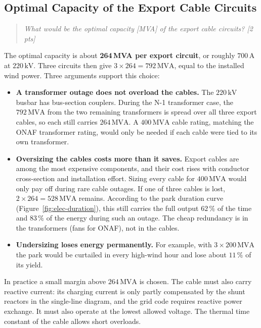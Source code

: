 \subsection{Optimal Capacity of the Export Cable Circuits}
\label{sec:elec-export-capacity}
\begin{quote}
\emph{What would be the optimal capacity [MVA] of the export cable circuits? [2 pts]}
\end{quote}

The optimal capacity is about \textbf{264\,MVA per export circuit}, or roughly $700\,\mathrm{A}$ at $220\,\mathrm{kV}$. Three circuits then give $3 \times 264 = 792\,\mathrm{MVA}$, equal to the installed wind power. Three arguments support this choice:

\begin{itemize}
    \item \textbf{A transformer outage does not overload the cables.} The $220\,\mathrm{kV}$ busbar has bus-section couplers. During the N-1 transformer case, the $792\,\mathrm{MVA}$ from the two remaining transformers is spread over all three export cables, so each still carries $264\,\mathrm{MVA}$. A $400\,\mathrm{MVA}$ cable rating, matching the ONAF transformer rating, would only be needed if each cable were tied to its own transformer.
    \item \textbf{Oversizing the cables costs more than it saves.} Export cables are among the most expensive components, and their cost rises with conductor cross-section and installation effort. Sizing every cable for $400\,\mathrm{MVA}$ would only pay off during rare cable outages. If one of three cables is lost, $2 \times 264 = 528\,\mathrm{MVA}$ remains. According to the park duration curve (Figure~\ref{fig:elec-duration}), this still carries the full output $62\,\%$ of the time and $83\,\%$ of the energy during such an outage. The cheap redundancy is in the transformers (fans for ONAF), not in the cables.
    \item \textbf{Undersizing loses energy permanently.} For example, with $3 \times 200\,\mathrm{MVA}$ the park would be curtailed in every high-wind hour and lose about $11\,\%$ of its yield.
\end{itemize}

In practice a small margin above $264\,\mathrm{MVA}$ is chosen. The cable must also carry reactive current: its charging current is only partly compensated by the shunt reactors in the single-line diagram, and the grid code requires reactive power exchange. It must also operate at the lowest allowed voltage. The thermal time constant of the cable allows short overloads.

